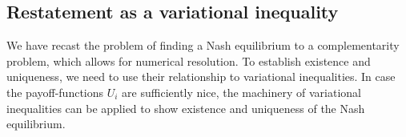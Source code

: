 \begin{comment}
\begin{equation}
  \begin{split}
  \nabla_{\sigma_i}U_i((\sigma_j)_{j=1}^M) \mid_{\sigma_i = \overbar{\sigma}_i}  + \mu_i - \lambda  \cdot 1_H = 0 \\
  \ip{\sigma_i}{\mu_i} = 0 \\
  \mu_i \in H_+ \\
  \sigma_i \in H_+ \\
  \int_X \sigma_i d\mu(x)- 1 = 0
\end{split}
\end{equation}
\end{comment}
\begin{comment}
The family of complementarity problems in \Cref{eq:comp_form} can be gathered into a single complementarity problem. We define $dU = \begin{pmatrix} \nabla_{\sigma_1} U_1 \mid_{\sigma_1 = \overbar{\sigma}_1}\\
    \vdots \\
    \nabla_{\sigma_N} U_N \mid_{\sigma_N = \overbar{\sigma}_N} \end{pmatrix}$, $S=(\sigma_i)_{i=1}^M$, and $\Lambda = (\lambda_i)_{i=1}^M$. Then \Cref{eq:KKT_total} can be restated as
\begin{equation}
  \label{eq:complementarity_form}
  \ip{dU(S)+\Lambda}{S} = 0 \\
  \ip{S_i-1}{1}\Lambda = 0
  -dU(S)-\Lambda \geq 0 \\
  \ip{S_i-1}{1} \in \{0 \}
  S\geq 0
  \Lambda \in \R^M
\end{equation}
which is a complementarity problem with $K = (H_+ \osum \R)^M$, $K^* = (H_+ \osum \{0\})^M$ and
\begin{equation}
  T(S,\lambda)=\begin{pmatrix} dU(S) + \Lambda \\ (\ip{\sigma_i}{1} - 1)_{i=1}^M \end{pmatrix}
\end{equation}
\end{comment}
\subsection{Restatement as a variational inequality}
We have recast the problem of finding a Nash equilibrium to a complementarity problem, which allows for numerical resolution. To establish existence and uniqueness, we need to use their relationship to variational inequalities. In case the payoff-functions $U_i $ are sufficiently nice, the machinery of variational inequalities can be applied to show existence and uniqueness of the Nash equilibrium.

